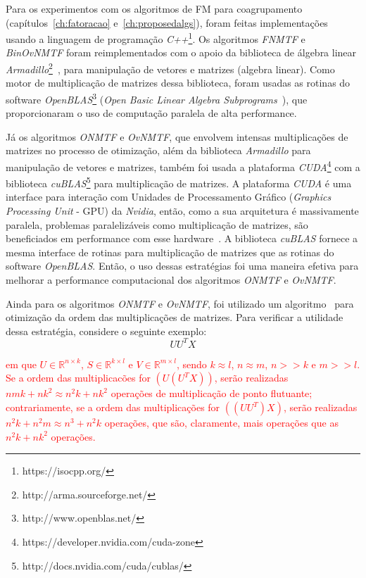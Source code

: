 \documentclass[
    12pt,                %
    oneside,            %
    a4paper,            %
    english,            %
    brazil                %
    ]{abntex2ppgsi}
\begin{document}
Para os experimentos com os algoritmos de FM para coagrupamento (capítulos~\ref{ch:fatoracao} e~\ref{ch:proposedalgs}), foram feitas implementações usando a linguagem de programação \textit{C++}\footnote{https://isocpp.org/}.
Os algoritmos \textit{FNMTF} e \textit{BinOvNMTF} foram reimplementados com o apoio da biblioteca de álgebra linear \textit{Armadillo}\footnote{http://arma.sourceforge.net/}~\cite{armadillo}, para manipulação de vetores e matrizes (algebra linear). Como motor de multiplicação de matrizes dessa biblioteca, foram usadas as rotinas do software \textit{OpenBLAS}\footnote{http://www.openblas.net/} (\textit{Open Basic Linear Algebra Subprograms}~\cite{openblas}), que proporcionaram o uso de computação paralela de alta performance. %

Já os algoritmos \textit{ONMTF} e \textit{OvNMTF}, que envolvem intensas multiplicações de matrizes no processo de otimização, além da biblioteca \textit{Armadillo} para manipulação de vetores e matrizes, também foi usada a plataforma \textit{CUDA}\footnote{https://developer.nvidia.com/cuda-zone} com a biblioteca \textit{cuBLAS}\footnote{http://docs.nvidia.com/cuda/cublas/} para multiplicação de matrizes.
A plataforma \textit{CUDA} é uma interface para interação com Unidades de Processamento Gráfico (\textit{Graphics Processing Unit} - GPU) da \textit{Nvidia}, então, como a sua arquitetura é massivamente paralela, problemas paralelizáveis como multiplicação de matrizes, são beneficiados em performance com esse hardware~\cite{Fatahalian2004}.
A biblioteca \textit{cuBLAS} fornece a mesma interface de rotinas para multiplicação de matrizes que as rotinas do software \textit{OpenBLAS}.
Então, o uso dessas estratégias foi uma maneira efetiva para melhorar a performance computacional dos algoritmos \textit{ONMTF} e \textit{OvNMTF}.


Ainda para os algoritmos \textit{ONMTF} e \textit{OvNMTF}, foi utilizado um algoritmo~\cite{Cormen2001} para otimização da ordem das multiplicações de matrizes.
Para verificar a utilidade dessa estratégia, considere o seguinte exemplo:
\[
    U U^T X
\]

\textcolor{red}{em que $U \in \mathbb{R}^{n \times k}$, $S \in \mathbb{R}^{k \times l}$ e $V \in \mathbb{R}^{m \times l}$, sendo $k \approx l$, $n \approx m$, $n >> k$ e $m >> l$.
Se a ordem das multiplicacões for $(U (U^T X))$, serão realizadas $nmk + nk^2 \approx n^2k + nk^2$ operações de multiplicação de ponto flutuante; contrariamente, se a ordem das multiplicações for $((U U^T) X)$, serão realizadas $n^2k + n^2m \approx n^3 + n^2k$ operações, que são, claramente, mais operações que as $n^2k + nk^2$ operações.}
\end{document}

